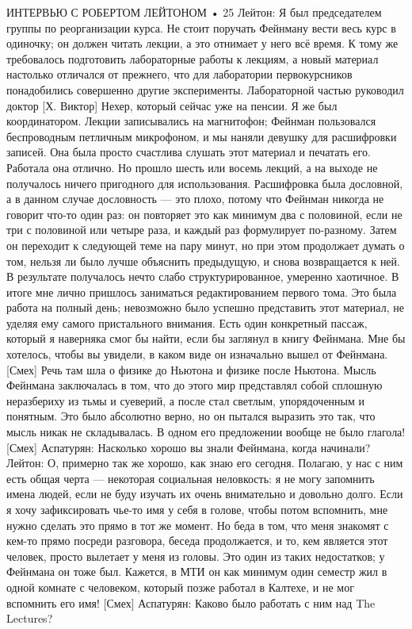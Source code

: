 \documentclass[10pt,oneside]{article}
\begin{document}
ИНТЕРВЬЮ С РОБЕРТОМ ЛЕЙТОНОМ • 25 Лейтон: Я был председателем группы по реорганизации курса. Не стоит поручать Фейнману вести весь курс в одиночку; он должен читать лекции, а это отнимает у него всё время. К тому же требовалось подготовить лабораторные работы к лекциям, а новый материал настолько отличался от прежнего, что для лаборатории первокурсников понадобились совершенно другие эксперименты. Лабораторной частью руководил доктор [Х. Виктор] Нехер, который сейчас уже на пенсии. Я же был координатором. Лекции записывались на магнитофон; Фейнман пользовался беспроводным петличным микрофоном, и мы наняли девушку для расшифровки записей. Она была просто счастлива слушать этот материал и печатать его. Работала она отлично. Но прошло шесть или восемь лекций, а на выходе не получалось ничего пригодного для использования. Расшифровка была дословной, а в данном случае дословность --- это плохо, потому что Фейнман никогда не говорит что-то один раз: он повторяет это как минимум два с половиной, если не три с половиной или четыре раза, и каждый раз формулирует по-разному. Затем он переходит к следующей теме на пару минут, но при этом продолжает думать о том, нельзя ли было лучше объяснить предыдущую, и снова возвращается к ней. В результате получалось нечто слабо структурированное, умеренно хаотичное. В итоге мне лично пришлось заниматься редактированием первого тома. Это была работа на полный день; невозможно было успешно представить этот материал, не уделяя ему самого пристального внимания. Есть один конкретный пассаж, который я наверняка смог бы найти, если бы заглянул в книгу Фейнмана. Мне бы хотелось, чтобы вы увидели, в каком виде он изначально вышел от Фейнмана. [Смех] Речь там шла о физике до Ньютона и физике после Ньютона. Мысль Фейнмана заключалась в том, что до этого мир представлял собой сплошную неразбериху из тьмы и суеверий, а после стал светлым, упорядоченным и понятным. Это было абсолютно верно, но он пытался выразить это так, что мысль никак не складывалась. В одном его предложении вообще не было глагола! [Смех] Аспатурян: Насколько хорошо вы знали Фейнмана, когда начинали? Лейтон: О, примерно так же хорошо, как знаю его сегодня. Полагаю, у нас с ним есть общая черта --- некоторая социальная неловкость: я не могу запомнить имена людей, если не буду изучать их очень внимательно и довольно долго. Если я хочу зафиксировать чье-то имя у себя в голове, чтобы потом вспомнить, мне нужно сделать это прямо в тот же момент. Но беда в том, что меня знакомят с кем-то прямо посреди разговора, беседа продолжается, и то, кем является этот человек, просто вылетает у меня из головы. Это один из таких недостатков; у Фейнмана он тоже был. Кажется, в МТИ он как минимум один семестр жил в одной комнате с человеком, который позже работал в Калтехе, и не мог вспомнить его имя! [Смех] Аспатурян: Каково было работать с ним над The Lectures?\par
\end{document}
